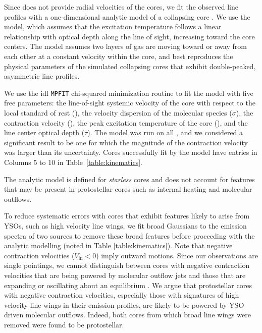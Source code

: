\documentclass[iop,twocolappendix]{emulateapj}
\begin{document}
Since {\deltaV} does not provide radial velocities of the cores, we fit the observed {\HCO} line profiles with a one-dimensional analytic model of a collapsing core \citep{DeVries2005}. We use the {\Hill} model, which assumes that the excitation temperature follows a linear relationship with optical depth along the line of sight, increasing toward the core centers. The {\Hill} model assumes two layers of gas are moving toward or away from each other at a constant velocity within the core, and best reproduces the physical parameters of the simulated collapsing cores that exhibit double-peaked, asymmetric line profiles.

We use the {\sc idl} {\tt MPFIT} chi-squared minimization routine \citep{Markwardt09} to fit the {\Hill} model with five free parameters: the line-of-sight systemic velocity of the core with respect to the local standard of rest (\Vmod), the velocity dispersion of the molecular species ($\sigma$), the contraction velocity ({\Vin}), the peak excitation temperature of the core ({\Tex}), and the line center optical depth ($\tau$). The {\Hill} model was run on all , and we considered a significant result to be one for which the magnitude of the contraction velocity was larger than its uncertainty. Cores successfully fit by the {\Hill} model have entries in Columns 5 to 10 in Table~\ref{table:kinematics}.

The analytic model is defined for \emph{starless} cores and does not account for features that may be present in protostellar cores such as internal heating and molecular outflows. 

To reduce systematic errors with cores that exhibit features likely to arise from YSOs, such as high velocity line wings, we fit broad Gaussians to the emission spectra of two sources to remove these broad features before proceeding with the analytic modelling (noted in Table \ref{table:kinematics}). Note that negative contraction velocities ($V_\mathrm{in} < 0$) imply outward motions. Since our observations are single pointings, we cannot distinguish between cores with negative contraction velocities that are being powered by molecular outflow jets and those that are expanding or oscillating about an equilibrium \citep{lada03,lee11,broderick10}. We argue that protostellar cores with negative contraction velocities, especially those with signatures of high velocity line wings in their emission profiles, are likely to be powered by YSO-driven molecular outflows. Indeed, both cores from which broad line wings were removed were found to be protostellar. %
\end{document}
